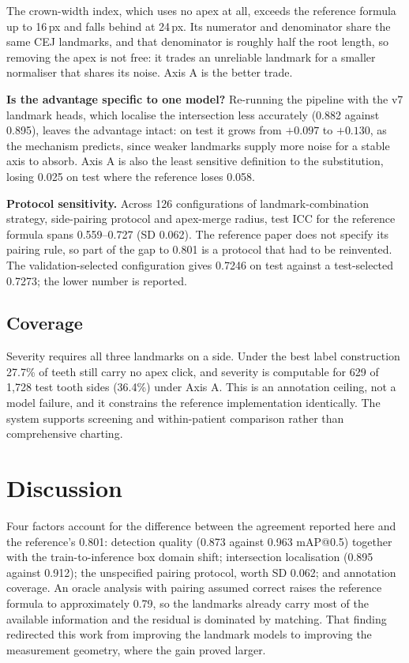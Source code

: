 \documentclass[conference]{IEEEtran}
\begin{document}
The crown-width index, which uses no apex at all, exceeds the reference formula up to 16\,px and falls behind at 24\,px. Its numerator and denominator share the same CEJ landmarks, and that denominator is roughly half the root length, so removing the apex is not free: it trades an unreliable landmark for a smaller normaliser that shares its noise. Axis A is the better trade.

\textbf{Is the advantage specific to one model?} Re-running the pipeline with the v7 landmark heads, which localise the intersection less accurately (0.882 against 0.895), leaves the advantage intact: on test it grows from $+0.097$ to $+0.130$, as the mechanism predicts, since weaker landmarks supply more noise for a stable axis to absorb. Axis A is also the least sensitive definition to the substitution, losing 0.025 on test where the reference loses 0.058.

\textbf{Protocol sensitivity.} Across 126 configurations of landmark-combination strategy, side-pairing protocol and apex-merge radius, test ICC for the reference formula spans 0.559--0.727 (SD 0.062). The reference paper does not specify its pairing rule, so part of the gap to 0.801 is a protocol that had to be reinvented. The validation-selected configuration gives 0.7246 on test against a test-selected 0.7273; the lower number is reported.

\subsection{Coverage}

Severity requires all three landmarks on a side. Under the best label construction 27.7\% of teeth still carry no apex click, and severity is computable for 629 of 1{,}728 test tooth sides (36.4\%) under Axis A. This is an annotation ceiling, not a model failure, and it constrains the reference implementation identically. The system supports screening and within-patient comparison rather than comprehensive charting.

\section{Discussion}
\label{sec:discussion}

Four factors account for the difference between the agreement reported here and the reference's 0.801: detection quality (0.873 against 0.963 mAP@0.5) together with the train-to-inference box domain shift; intersection localisation (0.895 against 0.912); the unspecified pairing protocol, worth SD 0.062; and annotation coverage. An oracle analysis with pairing assumed correct raises the reference formula to approximately 0.79, so the landmarks already carry most of the available information and the residual is dominated by matching. That finding redirected this work from improving the landmark models to improving the measurement geometry, where the gain proved larger.
\end{document}
